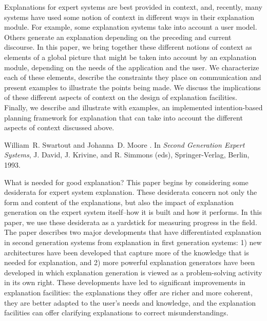 \begin{thebibliography}{10}
{\leftskip=0.1in\rightskip=0.1in\begin{small}\par{}Explanations for expert systems are best provided in
context, and, recently, many systems have used some notion of context in
different ways in their explanation module. For example, some
explanation systems take into account a user model. Others generate an
explanation depending on the preceding and current discourse. In this
paper, we bring together these different notions of context as elements
of a global picture that might be taken into account by an explanation
module, depending on the needs of the application and the user. We
characterize each of these elements, describe the constraints they place
on communication and present examples to illustrate the points being
made. We discuss the implications of these different aspects of context
on the design of explanation facilities.  Finally, we describe and
illustrate with examples, an implemented intention-based planning
framework for explanation that can take into account the different
aspects of context discussed above.
  \end{small}\par}
\noindent\hspace*{\itemindent}{\leftskip=0.1in\rightskip=0.1in\hrulefill}



William~R. Swartout and Johanna~D. Moore
.
\newblock In {\em Second Generation Expert Systems}, J. David, J.
Krivine, and R. Simmons (eds), Springer-Verlag, Berlin, 1993.

{\leftskip=0.1in\rightskip=0.1in\begin{small}\par{}What is needed for good explanation?  This paper begins by considering some
desiderata for expert system explanation.  These desiderata concern not
only the form and content of the explanations, but also the impact of
explanation generation on the expert system itself--how it is built and how
it performs.  In this paper, we use these desiderata as a yardstick for
measuring progress in the field.  The paper describes two major
developments that have differentiated explanation in second generation
systems from explanation in first generation systems: 1) new architectures
have been developed that capture more of the knowledge that is needed for
explanation, and 2) more powerful explanation generators have been
developed in which explanation generation is viewed as a problem-solving
activity in its own right.  These developments have led to significant
improvements in explanation facilities: the explanations they offer are
richer and more coherent, they are better adapted to the user's needs and
knowledge, and the explanation facilities can offer clarifying explanations
to correct misunderstandings.
  \end{small}\par}
\noindent\hspace*{\itemindent}{\leftskip=0.1in\rightskip=0.1in\hrulefill}



\end{thebibliography}
